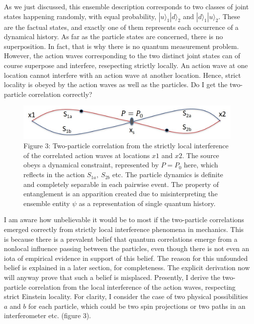 As we just discussed, this ensemble description corresponds to two classes of joint states
happening randomly, with equal probability, $|u \rangle_1 |d \rangle_2$ and $|d \rangle_1 |u \rangle_2$. These are the factual
states, and exactly one of them represents each occurrence of a dynamical history. As far
as the particle states are concerned, there is no superposition. In fact, that is why there
is no quantum measurement problem. However, the action waves corresponding to the two
distinct joint states can of course superpose and interfere, resepecting strictly locally. An
action wave at one location cannot interfere with an action wave at another location. Hence,
strict locality is obeyed by the action waves as well as the particles. Do I get the two-particle
correlation correctly?
\begin{figure}[H]
\centering
\includegraphics[scale=0.55]{src/images/chap27/3.jpg}
\captionsetup{singlelinecheck = false, format= hang, justification=raggedright, font=footnotesize, labelsep=space}
\caption*{Figure 3: Two-particle correlation from the strictly local interference of the correlated action waves at
locations $x1$ and $x2$. The source obeys a dynamical constraint, represented by $P = P_0$ here, which
reflects in the action $S_{1a}, ~S_{2b}$ etc. The particle dynamics is definite and completely separable in
each pairwise event. The property of entanglement is an apparition created due to misinterpreting
the ensemble entity $\psi$ as a representation of single quantum history.}
\end{figure}

I am aware how unbelievable it would be to most if the two-particle correlations emerged
correctly from strictly local interference phenomena in mechanics. This is because there is a
prevalent belief that quantum correlations emerge from a nonlocal influence passing between
the particles, even though there is not even an iota of empirical evidence in support of this
belief. The reason for this unfounded belief is explained in a later section, for completeness.
The explicit derivation now will anyway prove that such a belief is misplaced. Presently, I
derive the two-particle correlation from the local interference of the action waves, respecting
strict Einstein locality. For clarity, I consider the case of two physical possibilities $a$ and $b$
for each particle, which could be two spin projections or two paths in an interferometer etc.
(figure 3).

